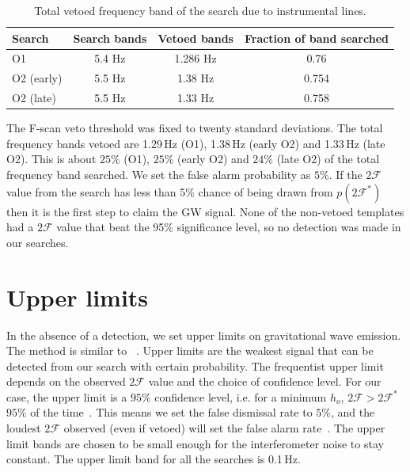 \documentclass{ttuthes2007}
\begin{document}
\begin{table} 
\centering
\begin{tabular}{lccc} 
\hline
\hline
\textrm{Search} & \textrm{Search bands} & \textrm{Vetoed bands} &
\textrm{Fraction of band searched}\\[5pt]   
\hline
\ac{O1} & 5.4 Hz & 1.286 Hz & 0.76\\[5pt] 
\ac{O2} (early)& 5.5 Hz  & 1.38 Hz & 0.754\\[5pt] 
\ac{O2} (late) & 5.5 Hz & 1.33 Hz & 0.758\\  
\hline
\hline
\end{tabular} 
\caption{Total vetoed frequency band of the search due to instrumental
lines.}\label{table:veto} 
\end{table} 

 
The F-scan veto threshold was fixed to twenty standard
deviations. The total frequency bands vetoed are 1.29\,Hz (O1), 1.38\,Hz
(early O2) and 1.33\,Hz (late O2). This is about $25\%$ (O1), $25\%$ (early O2)
and $24\%$ (late O2) of the total frequency band searched. We set the false
alarm probability as $5\%$. If the $2\mathcal{F}$
value from the search has less than 5\% chance of being drawn from
$p(2\mathcal{F}^*)$ then it is the first step to claim the \ac{GW} signal. None
of the non-vetoed templates had a $2\mathcal{F}$ value that beat the 95\%
significance level, so no detection was made in our searches.

\section{Upper limits}
In the absence of a detection, we set upper limits on gravitational wave
emission. The method is similar to ~\citet{Lindblom_2020}. Upper limits are the
weakest signal that can be detected from our search with certain probability.
The frequentist upper limit depends on the observed $2\mathcal{F}$ value and the
choice of confidence level. For our case, the upper limit is a $95\%$ confidence
level, i.e. for a minimum $h_o$, $2\mathcal{F} > 2\mathcal{F}^*$ $95\%$ of the
time~\cite{Romano_2017}. This means we set the false dismissal rate to $5\%$,
and the loudest $2\mathcal{F}$ observed (even if vetoed) will set the false alarm
rate~\cite{Aasi_2015}. The upper limit bands are chosen to be small enough for
the interferometer noise to stay constant. The upper limit band for all the
searches is 0.1\,Hz. 
\end{document}
